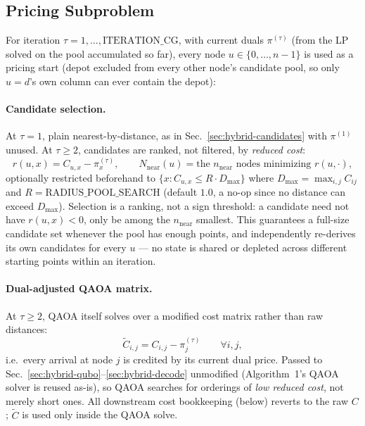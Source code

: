 \documentclass[11pt]{article}
\begin{document}
\subsection{Pricing Subproblem}
\label{sec:cg-pricing}

For iteration $\tau = 1,\dots,\mathrm{ITERATION\_CG}$, with current duals $\pi^{(\tau)}$ (from the LP solved on the pool accumulated so far), every node $u \in \{0,\dots,n-1\}$ is used as a pricing start (depot excluded from every other node's candidate pool, so only $u=d$'s own column can ever contain the depot):

\paragraph{Candidate selection.} At $\tau = 1$, plain nearest-by-distance, as in Sec.~\ref{sec:hybrid-candidates} with $\pi^{(1)}$ unused. At $\tau \ge 2$, candidates are ranked, not filtered, by \emph{reduced cost}:
\begin{equation}
  r(u,x) = C_{u,x} - \pi^{(\tau)}_x, \qquad
  N_{\mathrm{near}}(u) = \text{the } n_{\mathrm{near}} \text{ nodes minimizing } r(u,\cdot),
  \label{eq:reduced-cost-rank}
\end{equation}
optionally restricted beforehand to $\{x : C_{u,x} \le R \cdot D_{\max}\}$ where $D_{\max} = \max_{i,j} C_{ij}$ and $R = \mathrm{RADIUS\_POOL\_SEARCH}$ (default $1.0$, a no-op since no distance can exceed $D_{\max}$). Selection is a ranking, not a sign threshold: a candidate need not have $r(u,x) < 0$, only be among the $n_{\mathrm{near}}$ smallest. This guarantees a full-size candidate set whenever the pool has enough points, and independently re-derives its own candidates for every $u$ — no state is shared or depleted across different starting points within an iteration.

\paragraph{Dual-adjusted QAOA matrix.} At $\tau \ge 2$, QAOA itself solves over a modified cost matrix rather than raw distances:
\begin{equation}
  \tilde{C}_{i,j} = C_{i,j} - \pi^{(\tau)}_j \qquad \forall i,j,
  \label{eq:dual-matrix}
\end{equation}
i.e.\ every arrival at node $j$ is credited by its current dual price. Passed to Sec.~\ref{sec:hybrid-qubo}--\ref{sec:hybrid-decode} unmodified (Algorithm~1's QAOA solver is reused as-is), so QAOA searches for orderings of \emph{low reduced cost}, not merely short ones. All downstream cost bookkeeping (below) reverts to the raw $C$; $\tilde C$ is used only inside the QAOA solve.
\end{document}

